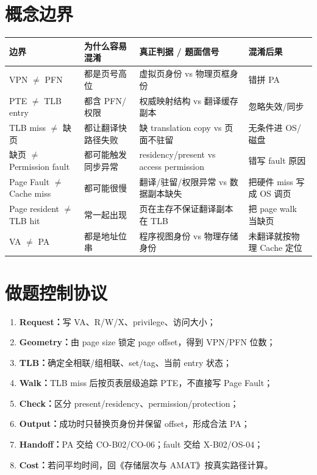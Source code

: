 \documentclass[UTF8,fontset=fandol,11pt,a4paper]{ctexart}
\newcommand{\kw}[1]{\textbf{\color{deep}#1}}\newcommand{\code}[1]{\texttt{#1}}
\begin{document}
\section{概念边界}
\begin{center}\small
\begin{tabularx}{\linewidth}{L{2.2cm}L{2.7cm}YY}
\toprule
边界 & 为什么容易混淆 & 真正判据 / 题面信号 & 混淆后果\\\midrule
VPN $\neq$ PFN & 都是页号高位 & 虚拟页身份 vs 物理页框身份 & 错拼 PA\\
PTE $\neq$ TLB entry & 都含 PFN/权限 & 权威映射结构 vs 翻译缓存副本 & 忽略失效/同步\\
TLB miss $\neq$ 缺页 & 都让翻译快路径失败 & 缺 translation copy vs 页面不驻留 & 无条件进 OS/磁盘\\
缺页 $\neq$ Permission fault & 都可能触发同步异常 & residency/present vs access permission & 错写 fault 原因\\
Page Fault $\neq$ Cache miss & 都可能很慢 & 翻译/驻留/权限异常 vs 数据副本缺失 & 把硬件 miss 写成 OS 调页\\
Page resident $\neq$ TLB hit & 常一起出现 & 页在主存不保证翻译副本在 TLB & 把 page walk 当缺页\\
VA $\neq$ PA & 都是地址位串 & 程序视图身份 vs 物理存储身份 & 未翻译就按物理 Cache 定位\\
\bottomrule
\end{tabularx}
\end{center}

\section{做题控制协议}
\begin{enumerate}
\item \kw{Request：}写 VA、R/W/X、privilege、访问大小；
\item \kw{Geometry：}由 page size 锁定 page offset，得到 VPN/PFN 位数；
\item \kw{TLB：}确定全相联/组相联、set/tag、当前 entry 状态；
\item \kw{Walk：}TLB miss 后按页表层级追踪 PTE，不直接写 Page Fault；
\item \kw{Check：}区分 present/residency、permission/protection；
\item \kw{Output：}成功时只替换页身份并保留 offset，形成合法 PA；
\item \kw{Handoff：}PA 交给 CO-B02/CO-06；fault 交给 X-B02/OS-04；
\item \kw{Cost：}若问平均时间，回《存储层次与 AMAT》按真实路径计算。
\end{enumerate}
\end{document}
